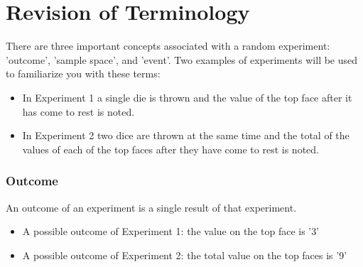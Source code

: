  \label{m39377*uid4}
            \section{ Revision of Terminology}
            \nopagebreak
        \label{m39377*eip-499}There are three important concepts associated with a
random experiment: 'outcome', 'sample space', and 'event'. Two examples of
experiments will be used to familiarize you with these terms:\par \label{m39377*id110091}\begin{itemize}[noitemsep]
            \label{m39377*uid5}\item In Experiment
1 a single die is thrown and the value of the top face after it has come to rest
is noted.
\label{m39377*uid6}\item In Experiment 2 two dice are thrown at the same time
and the total of the values of each of the top faces after they have come to
rest is noted.
\end{itemize}
        \label{m39377*id110119}
            \subsubsection{ Outcome}
            \nopagebreak
          \label{m39377*id110125}An outcome of an experiment is a single result of
that experiment.\par \label{m39377*eip-733}\begin{itemize}[noitemsep]
            \item A possible outcome of Experiment
1: the value on the top face is '3'\item A possible outcome of Experiment 2: the total value on the top faces is
'9'\end{itemize}
        \label{m39377*id110131}

